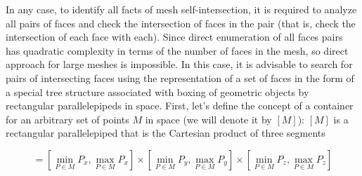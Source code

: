 \documentclass[
11pt,%
tightenlines,%
twoside,%
onecolumn,%
nofloats,%
nobibnotes,%
nofootinbib,%
superscriptaddress,%
noshowpacs,%
centertags]%
{revtex4-2}
\begin{document}
In any case, to identify all facts of mesh self-intersection, it is required to analyze all pairs of faces and check the intersection of faces in the pair (that is, check the intersection of each face with each).
Since direct enumeration of all faces pairs has quadratic complexity in terms of the number of faces in the mesh, so direct approach for large meshes is impossible.
In this case, it is advisable to search for pairs of intersecting faces using the representation of a set of faces in the form of a special tree structure associated with boxing of geometric objects by rectangular parallelepipeds in space.
First, let's define the concept of a container for an arbitrary set of points $M$ in space (we will denote it by $[M]$): $[M]$ is a rectangular parallelepiped that is the Cartesian product of three segments

\begin{equation}
[M] = \left[\min_{P \in M}{P_x}, \max_{P \in M}{P_x}\right]
      \times \left[\min_{P \in M}{P_y}, \max_{P \in M}{P_y}\right]
      \times \left[\min_{P \in M}{P_z}, \max_{P \in M}{P_z}\right]
\end{equation}
\end{document}
